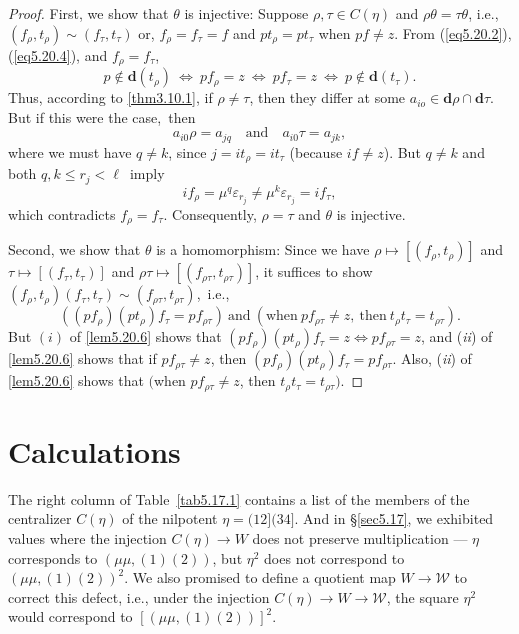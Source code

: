 \documentclass{surv-l}
\numberwithin{equation}{section}
\numberwithin{table}{section}
\numberwithin{figure}{section}
\theoremstyle{definition}
\begin{document}
\begin{proof}
First, we show that $\theta$ is injective: Suppose $\rho, \tau\in
C(\eta)$ and $\rho\theta=\tau\theta$, i.e.,
$(f_{\rho},t_{\rho})\sim(f_{\tau}, t_{\tau})$ or,
$f_{\rho}=f_{\tau}=f$ and $pt_{\rho}=pt_{\tau}$ when $pf\neq z$.
From (\ref{eq5.20.2}), (\ref{eq5.20.4}), and $f_{\rho}=f_{\tau}$,
\[
p\not\in \mathbf{d}(t_{\rho})\ \Leftrightarrow\ pf_{\rho}=z\ \Leftrightarrow\ pf_{\tau}
=z\ \Leftrightarrow\ p\not\in \mathbf{d}(t_{\tau}).
\]
Thus, according to \ref{thm3.10.1}, if $\rho\neq\tau$, then they
differ at some $ a_{io}\in \mathbf{d}\rho\cap \mathbf{d}\tau$. But
if this were the case,~then
\[
a_{i0}\rho=a_{jq}\quad \mathrm{and}\quad a_{i0}\tau=a_{jk},
\]
where we must have $q\neq k$, since $j=it_{\rho}=it_{\tau}$
(because $if\neq z$). But $q\neq k$ and both $q,  k\leq
r_{j}<\ell$~imply
\[
if_{\rho}=\mu^{q}\varepsilon_{r_{j}}\neq\mu^{k}\varepsilon_{r_{j}}=if_{\tau},
\]
which contradicts $f_{\rho}=f_{\tau}$. Consequently, $\rho=\tau$
and $\theta$ is injective.

\noindent Second, we show that $\theta$ is a homomorphism: Since
we have $\rho\mapsto[(f_{\rho}, t_{\rho})]$ and
$\tau\mapsto[(f_{\tau}, t_{\tau})]$ and
$\rho\tau\mapsto[(f_{\rho\tau}, t_{\rho\tau})]$, it suffices to
show $(f_{\rho}, t_{\rho})(f_{\tau}, t_{\tau})\sim (f_{\rho\tau},
t_{\rho\tau})$,~i.e.,
\[
((pf_{\rho})(pt_{\rho})f_{\tau}=pf_{\rho\tau})\ \mathrm{and}\ (\mathrm{when}\
pf_{\rho\tau}\neq z,\ \mathrm{then}\ t_{\rho}t_{\tau}=t_{\rho\tau}).
\]
But $(i)$ of \ref{lem5.20.6} shows that
$(pf_{\rho})(pt_{\rho})f_{\tau}=z\Leftrightarrow pf_{\rho\tau}=z$,
and (\emph{ii}) of \ref{lem5.20.6} shows that if
$pf_{\rho\tau}\neq z$, then
$(pf_{\rho})(pt_{\rho})f_{\tau}=pf_{\rho\tau}$. Also, (\emph{ii})
of \ref{lem5.20.6} shows that $($when $pf_{\rho\tau}\neq z$, then
$t_{\rho}t_{\tau}=t_{\rho\tau}).$
\end{proof}

\section{Calculations}\label{sec5.21}

The right column of Table~\ref{tab5.17.1} contains a list of the
members of the centralizer $C(\eta)$ of the nilpotent
$\eta=(12](34]$. And in \S\ref{sec5.17}, we exhibited values where
the injection $C(\eta)\rightarrow W$ does not preserve
multiplication --- $\eta$ corresponds to $(\mu\mu, (1)(2))$, but
$\eta^{2}$ does not correspond to $(\mu\mu,(1)(2))^{2}$. We also
promised to define a quotient map $W\rightarrow \mathcal{W}$ to
correct this defect, i.e., under the injection $C(\eta)\rightarrow
W\rightarrow \mathcal{W}$, the square $\eta^{2}$ would correspond
to $\left[\left(\mu\mu,(1)(2)\right)\right]^{2}$.
\end{document}
